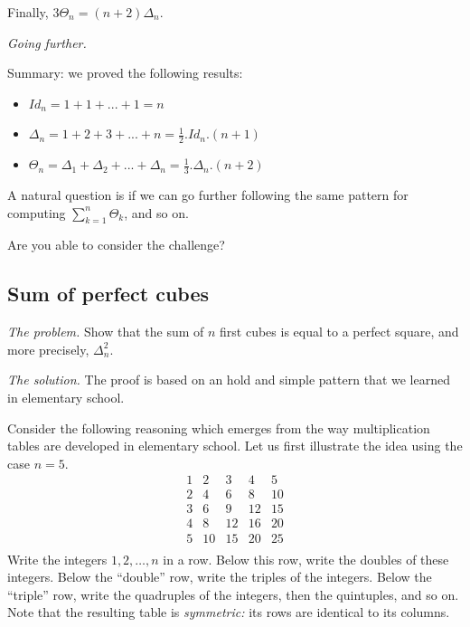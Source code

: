 Finally, $3 \Theta_n = (n+2) \Delta_n$.
\medskip

\noindent \textit{Going further.}

Summary: we proved the following results:
\begin{itemize}
\item $Id_n = 1+1+ ... +1 = n$
\item $\Delta_n = 1+2+3+ ... +n = \frac{1}{2}.Id_n.(n+1)$
\item $\Theta_n = \Delta_1 + \Delta_2 + ... + \Delta_n = \frac{1}{3} .\Delta_n.(n+2)$
\end{itemize}

A natural question is if we can go further following the same pattern for computing 
$ \sum_{k=1}^{n} \Theta_k$, and so on.

Are you able to consider the challenge?


\subsection{Sum of perfect cubes}

\noindent \textit{The problem.}
Show that the sum of $n$ first cubes is equal to a perfect square, and more precisely, $\Delta_n^2$.
\medskip

\noindent \textit{The solution.}
The proof is based on an hold and simple pattern that we learned in elementary school.
\medskip


%
Consider the following reasoning which emerges from the way
multiplication tables are developed in elementary school.  
Let us first illustrate the idea using the case $n=5$.
\begin{equation}
\label{eq:Fubini-table}
\begin{array}{rrrrr}
1  &  2 &  3 &  4 &  5 \\
2  &  4 &  6 &  8 & 10 \\
3  &  6 &  9 & 12 & 15 \\
4  &  8 & 12 & 16 & 20 \\
5  & 10 & 15 & 20 & 25 \\
\end{array}
\end{equation}
Write the integers $1, 2, \ldots, n$ in a row.  Below this row, write
the doubles of these integers.  Below the ``double'' row, write the
triples of the integers.  Below the ``triple'' row, write the
quadruples of the integers, then the quintuples, and so on.  Note that
the resulting table is {\em symmetric:} its rows are identical to its
columns.
\medskip

